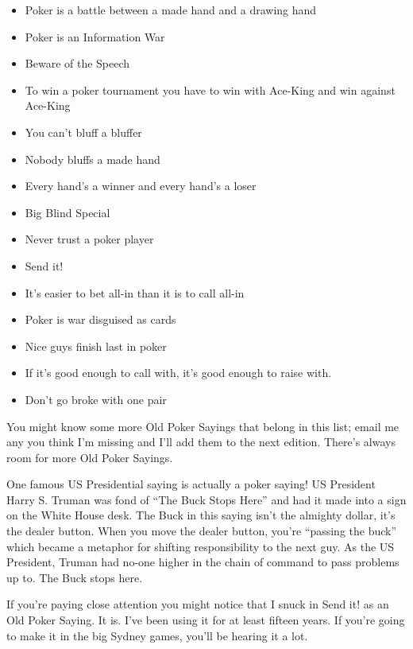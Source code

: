 \begin{itemize}
  \item Poker is a battle between a made hand and a drawing hand
  \item Poker is an Information War
  \item Beware of the Speech
  \item To win a poker tournament you have to win with Ace-King and win
    against Ace-King
  \item You can't bluff a bluffer
  \item Nobody bluffs a made hand
  \item Every hand's a winner and every hand's a loser
  \item Big Blind Special
  \item Never trust a poker player
  \item Send it!
  \item It's easier to bet all-in than it is to call all-in
  \item Poker is war disguised as cards
  \item Nice guys finish last in poker
  \item If it's good enough to call with, it's good enough to raise with.
  \item Don't go broke with one pair
\end{itemize}

You might know some more Old Poker Sayings that belong in this list;
email me any you think I'm missing and I'll add them to the next
edition. There's always room for more Old Poker Sayings.

One famous US Presidential saying is actually a poker saying!
US President Harry S. Truman was fond of ``The Buck Stops Here'' and
had it made into a sign on the White House desk. The Buck in
this saying isn't the almighty dollar, it's the dealer button. When
you move the dealer button, you're ``passing the buck'' which became a
metaphor for shifting responsibility to the next guy. As the US
President, Truman had no-one higher in the chain of command to pass
problems up to. The Buck stops here.

If you're paying close attention you might notice that I snuck in
Send it! as an Old Poker Saying. It is. I've been using it for at
least fifteen years. If you're going to make it in the big Sydney
games, you'll be hearing it a lot.
